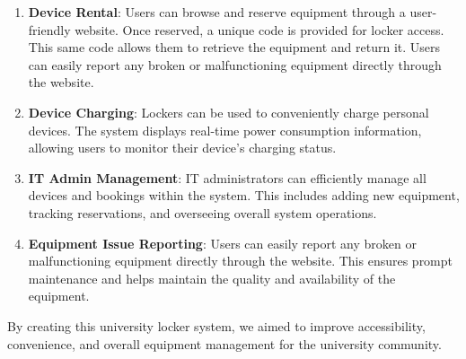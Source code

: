 \begin{enumerate}
    \item \textbf{Device Rental}: Users can browse and reserve equipment through a user-friendly website. Once reserved, a unique code is provided for locker access. This same code allows them to retrieve the equipment and return it. Users can easily report any broken or malfunctioning equipment directly through the website.
    \item \textbf{Device Charging}: Lockers can be used to conveniently charge personal devices. The system displays real-time power consumption information, allowing users to monitor their device's charging status.
    \item \textbf{IT Admin Management}: IT administrators can efficiently manage all devices and bookings within the system. This includes adding new equipment, tracking reservations, and overseeing overall system operations.
    \item \textbf{Equipment Issue Reporting}: Users can easily report any broken or malfunctioning equipment directly through the website. This ensures prompt maintenance and helps maintain the quality and availability of the equipment.
\end{enumerate}

By creating this university locker system, we aimed to improve accessibility, convenience, and overall equipment management for the university community.
